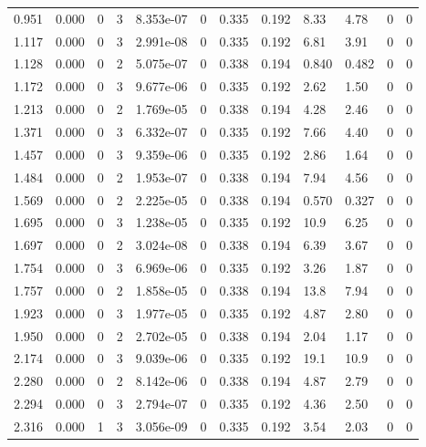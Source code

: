 \documentclass[preview]{standalone}
\begin{document}
{{\begin{tabular}{L{1.2cm}C{1.2cm} C{0.3cm}C{0.5cm} C{1.4cm}C{1.4cm} C{1.4cm}C{1.4cm} C{1.6cm}C{1.6cm} C{1.6cm}C{1.6cm}}
  0.951  &  0.000  & 0     &  3 &  8.353e-07  & 0  &  0.335&   0.192& 8.33 & 4.78   &  0 & 0  \\ 
  1.117  &  0.000  & 0     &  3 &  2.991e-08  & 0  &  0.335&   0.192& 6.81 & 3.91   &  0 & 0  \\ 
  1.128  &  0.000  & 0     &  2 &  5.075e-07  & 0  &  0.338&   0.194& 0.840 & 0.482   &  0 & 0  \\ 
  1.172  &  0.000  & 0     &  3 &  9.677e-06  & 0  &  0.335&   0.192& 2.62 & 1.50   &  0 & 0  \\ 
  1.213  &  0.000  & 0     &  2 &  1.769e-05  & 0  &  0.338&   0.194& 4.28 & 2.46   &  0 & 0  \\ 
  1.371  &  0.000  & 0     &  3 &  6.332e-07  & 0  &  0.335&   0.192& 7.66 & 4.40   &  0 & 0  \\ 
  1.457  &  0.000  & 0     &  3 &  9.359e-06  & 0  &  0.335&   0.192& 2.86 & 1.64   &  0 & 0  \\ 
  1.484  &  0.000  & 0     &  2 &  1.953e-07  & 0  &  0.338&   0.194& 7.94 & 4.56   &  0 & 0  \\ 
  1.569  &  0.000  & 0     &  2 &  2.225e-05  & 0  &  0.338&   0.194& 0.570 & 0.327   &  0 & 0  \\ 
  1.695  &  0.000  & 0     &  3 &  1.238e-05  & 0  &  0.335&   0.192& 10.9 & 6.25   &  0 & 0  \\ 
  1.697  &  0.000  & 0     &  2 &  3.024e-08  & 0  &  0.338&   0.194& 6.39 & 3.67   &  0 & 0  \\ 
  1.754  &  0.000  & 0     &  3 &  6.969e-06  & 0  &  0.335&   0.192& 3.26 & 1.87   &  0 & 0  \\ 
  1.757  &  0.000  & 0     &  2 &  1.858e-05  & 0  &  0.338&   0.194& 13.8 & 7.94   &  0 & 0  \\ 
  1.923  &  0.000  & 0     &  3 &  1.977e-05  & 0  &  0.335&   0.192& 4.87 & 2.80   &  0 & 0  \\ 
  1.950  &  0.000  & 0     &  2 &  2.702e-05  & 0  &  0.338&   0.194& 2.04 & 1.17   &  0 & 0  \\ 
  2.174  &  0.000  & 0     &  3 &  9.039e-06  & 0  &  0.335&   0.192& 19.1 & 10.9   &  0 & 0  \\ 
  2.280  &  0.000  & 0     &  2 &  8.142e-06  & 0  &  0.338&   0.194& 4.87 & 2.79   &  0 & 0  \\ 
  2.294  &  0.000  & 0     &  3 &  2.794e-07  & 0  &  0.335&   0.192& 4.36 & 2.50   &  0 & 0  \\ 
  2.316  &  0.000  & 1     &  3 &  3.056e-09  & 0  &  0.335&   0.192& 3.54 & 2.03   &  0 & 0  \\ 

\end{tabular}}}
\end{document}
